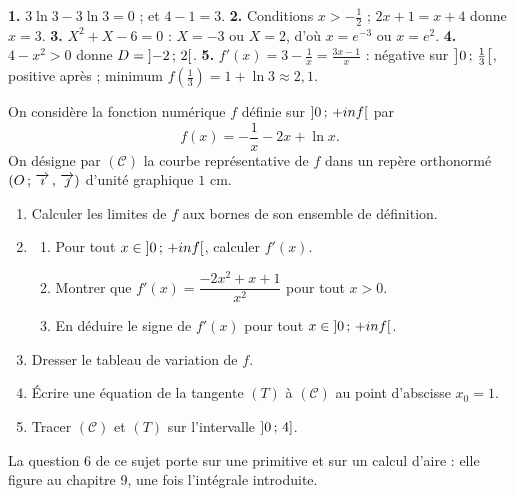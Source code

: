 \begin{corrige}[je me teste]
\textbf{1.} $3\ln3-3\ln3 = 0$ ; et $4-1 = 3$.
\textbf{2.} Conditions $x>-\frac12$ ; $2x+1 = x+4$ donne $x = 3$.
\textbf{3.} $X^{2}+X-6 = 0$ : $X = -3$ ou $X = 2$, d'où $x = e^{-3}$ ou
$x = e^{2}$.
\textbf{4.} $4-x^{2}>0$ donne $D = \left]-2\,;\,2\right[$.
\textbf{5.} $f'(x) = 3-\frac1x = \frac{3x-1}{x}$ : négative sur
$\left]0\,;\,\frac13\right[$, positive après ; minimum
$f\left(\frac13\right) = 1+\ln3 \approx 2{,}1$.
\end{corrige}

\begin{commeaubac}
On considère la fonction numérique $f$ définie sur
$\left]0\,;\,+inf\right[$ par
\[
  f(x) = -\frac1x-2x+\ln x .
\]
On désigne par $(\mathcal C)$ la courbe représentative de $f$ dans un repère
orthonormé $\left(O\,;\,\overrightarrow{\imath}\,,\,\overrightarrow{\jmath}\right)$ d'unité graphique $1$ cm.

\begin{enumerate}[label=\textbf{\arabic*.}, leftmargin=*, itemsep=0.25em]
  \item Calculer les limites de $f$ aux bornes de son ensemble de
        définition. 
  \item \begin{enumerate}[label=\textbf{\alph*)}, leftmargin=1.4em, itemsep=0.15em]
      \item Pour tout $x \in \left]0\,;\,+inf\right[$, calculer $f'(x)$.
      \item Montrer que $f'(x) = \dfrac{-2x^{2}+x+1}{x^{2}}$ pour tout
            $x>0$. 
      \item En déduire le signe de $f'(x)$ pour tout
            $x \in \left]0\,;\,+inf\right[$. 
    \end{enumerate}
  \item Dresser le tableau de variation de $f$. 
  \item Écrire une équation de la tangente $(T)$ à $(\mathcal C)$ au point
        d'abscisse $x_{0} = 1$. 
  \item Tracer $(\mathcal C)$ et $(T)$ sur l'intervalle
        $\left]0\,;\,4\right]$. 
\end{enumerate}

\begin{remarque}
La question 6 de ce sujet porte sur une primitive et sur un calcul d'aire :
elle figure au chapitre 9, une fois l'intégrale introduite.
\end{remarque}
\end{commeaubac}

